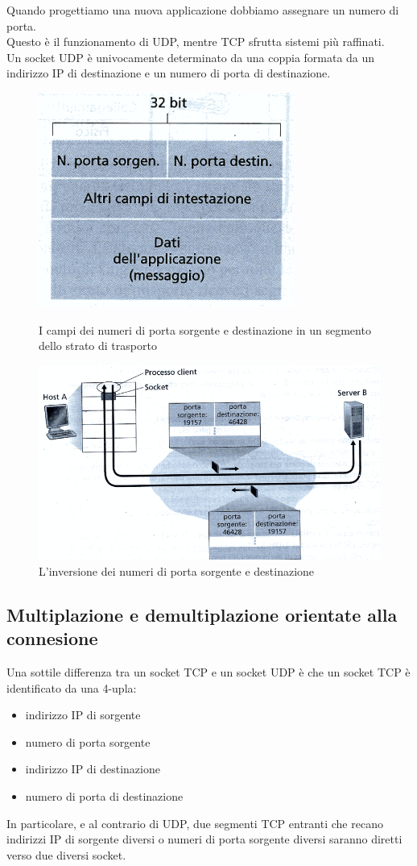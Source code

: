 \documentclass[11pt,a4paper]{book}
\begin{document}
Quando progettiamo una nuova applicazione dobbiamo assegnare un numero di porta. \\
Questo è il funzionamento di UDP, mentre TCP sfrutta sistemi più raffinati. \\
Un socket UDP è univocamente determinato da una coppia formata da un indirizzo IP di destinazione e un numero di porta di destinazione.


\begin{figure}
	\begin{center}
		\includegraphics[scale=1]{img/011.png}
		\caption{I campi dei numeri di porta sorgente e destinazione in un segmento dello strato di trasporto} 
	\end{center}
	\includegraphics[scale=0.6]{img/012.png}
	\caption{L'inversione dei numeri di porta sorgente e destinazione}
\end{figure}


\subsection{Multiplazione e demultiplazione orientate alla connesione}
Una sottile differenza tra un socket TCP e un socket UDP è che un socket TCP è identificato da una 4-upla:
\begin{itemize}
	\item indirizzo IP di sorgente
	\item numero di porta sorgente
	\item indirizzo IP di destinazione
	\item numero di porta di destinazione
\end{itemize}
In particolare, e al contrario di UDP, due segmenti TCP entranti che recano indirizzi IP di sorgente diversi o numeri di porta sorgente diversi saranno diretti verso due diversi socket. \\
\end{document}
